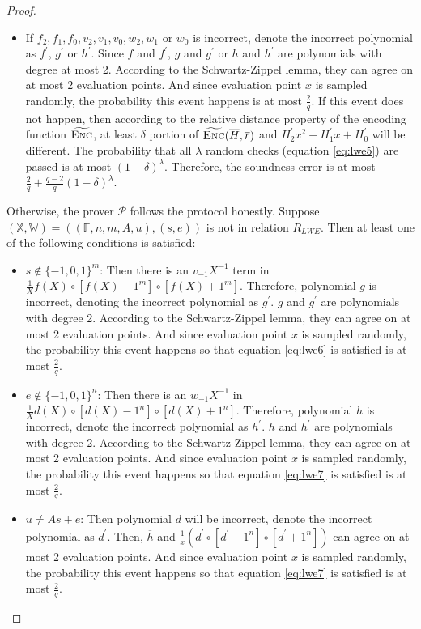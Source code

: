 \begin{proof}
\begin{itemize}
    \item If $f_2, f_1, f_0, v_2, v_1, v_0, w_2, w_1$ or $w_0$ is incorrect, denote the incorrect polynomial as $f^\prime$, $g^\prime$ or $h^\prime$. Since $f$ and $f^\prime$, $g$ and $g^\prime$ or $h$ and $h^\prime$ are polynomials with degree at most 2. According to the Schwartz-Zippel lemma, they can agree on at most 2 evaluation points. And since evaluation point $x$ is sampled randomly, the probability this event happens is at most $\frac{2}{q}$. If this event does not happen, then according to the relative distance property of the encoding function $\widetilde{\textsc{Enc}}$, at least $\delta$ portion of $\widetilde{\textsc{Enc}}(\overline{H}, \overline{r})$ and $H_2^\prime x^2 + H_1^\prime x + H_0^\prime$ will be different. The probability that all $\lambda$ random checks (equation \ref{eq:lwe5}) are passed is at most $(1 - \delta)^\lambda$. Therefore, the soundness error is at most $\frac{2}{q} + \frac{q-2}{q}(1 - \delta)^\lambda$.


\end{itemize}

Otherwise, the prover $\mathcal{P}$ follows the protocol honestly. Suppose $(\mathbb{X}, \mathbb{W}) = ((\mathbb{F}, n, m, A, u), (s, e))$ is not in relation $R_{LWE}$. Then at least one of the following conditions is satisfied:
\begin{itemize}
    \item $s \notin \{-1, 0, 1\}^{m}$: Then there is an $v_{-1} X^{-1}$ term in $\frac{1}{X} f(X) \circ [f(X) - 1^m] \circ [f(X) + 1^m]$. Therefore, polynomial $g$ is incorrect, denoting the incorrect polynomial as $g^\prime$. $g$ and $g^\prime$ are polynomials with degree 2. According to the Schwartz-Zippel lemma, they can agree on at most 2 evaluation points. And since evaluation point $x$ is sampled randomly, the probability this event happens so that equation \ref{eq:lwe6} is satisfied is at most $\frac{2}{q}$. 
    
    \item $e \notin \{-1, 0, 1\}^{n}$: Then there is an $w_{-1} X^{-1}$ in $\frac{1}{X} d(X) \circ [d(X) - 1^n] \circ [d(X) + 1^n]$. Therefore, polynomial $h$ is incorrect, denote the incorrect polynomial as $h^\prime$. $h$ and $h^\prime$ are polynomials with degree 2. According to the Schwartz-Zippel lemma, they can agree on at most 2 evaluation points. And since evaluation point $x$ is sampled randomly, the probability this event happens so that equation \ref{eq:lwe7} is satisfied is at most $\frac{2}{q}$. 
    
    \item $u \neq As + e$: Then polynomial $d$ will be incorrect, denote the incorrect polynomial as $d^\prime$. Then, $\overline{h}$ and $\frac{1}{x} (d^\prime \circ [d^\prime - 1^n] \circ [d^\prime + 1^n])$ can agree on at most 2 evaluation points. And since evaluation point $x$ is sampled randomly, the probability this event happens so that equation \ref{eq:lwe7} is satisfied is at most $\frac{2}{q}$. 
    
\end{itemize}


\end{proof}

